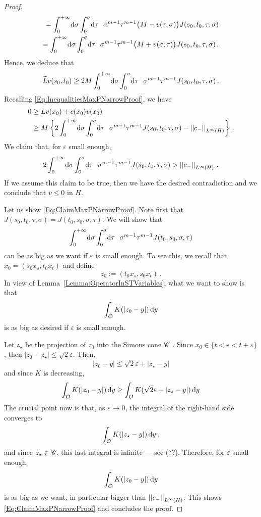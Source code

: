 \begin{proof}
\begin{align*}
	=  \int_0^{+\infty}  \!\! \d \sigma \int_0^{\sigma}  \!\! \d \tau \ \ \sigma^{m-1} \tau^{m-1} \big(M - v(\tau, \sigma)\big) J(s_0,t_0,\tau, \sigma)   \\
	=  \int_0^{+\infty}  \!\! \d \sigma \int_0^{\sigma}  \!\! \d \tau \ \ \sigma^{m-1} \tau^{m-1} \big(M + v(\sigma, \tau)\big) J(s_0,t_0,\tau, \sigma) \,.   \\
	\end{align*}
	Hence, we deduce that
	$$
	\widetilde{L} v (s_0,t_0) \geq 2M \int_0^{+\infty}  \!\! \d \sigma \int_0^{\sigma}  \!\! \d \tau \ \ \sigma^{m-1} \tau^{m-1} J(s_0,t_0,\tau, \sigma)\,.
	$$
	Recalling \eqref{Eq:InequalitiesMaxPNarrowProof}, we have
	\begin{align*}
	0& \geq L v(x_0) + c(x_0)v(x_0)  \\
	& \geq M \left\{ 2 \int_0^{+\infty}  \!\! \,\mathrm{d} \sigma \int_0^{\sigma}  \!\! \,\mathrm{d} \tau \ \ \sigma^{m-1} \tau^{m-1} J(s_0,t_0,\tau, \sigma) - \left | \left |{c_-} \right | \right |_{L^\infty(H)}
	\right\}\,.
	\end{align*}
	We claim that, for $\varepsilon$ small enough,
	\begin{equation}
	\label{Eq:ClaimMaxPNarrowProof}
	2 \int_0^{+\infty}  \!\! \d \sigma \int_0^{\sigma}  \!\! \d \tau \ \ \sigma^{m-1} \tau^{m-1} J(s_0,t_0,\tau, \sigma) > \norm{c_-}_{L^\infty(H)}\,.
	\end{equation}
	If we assume this claim to be true, then we have the desired contradiction and we conclude that $v \leq 0$ in $H$.
	
	Let us show \eqref{Eq:ClaimMaxPNarrowProof}. Note first that $J(s_0, t_0, \tau, \sigma) = J(t_0, s_0, \sigma, \tau)$. We will show that
	$$
	\int_0^{+\infty}  \!\! \,\mathrm{d} \sigma \int_0^{\sigma}  \!\! \,\mathrm{d} \tau \ \ \sigma^{m-1} \tau^{m-1} J(t_0, s_0, \sigma, \tau)
	$$
	can be as big as we want if $\varepsilon$ is small enough. To see this, we recall that $x_0 = (s_0 x_s, t_0 x_t)$ and define
	$$
	z_0 := (t_0 x_s,  s_0 x_t)\,.
	$$
	In view of Lemma~\ref{Lemma:OperatorInSTVariables}, what we want to show is that
	$$
	\int_{\mathcal{O}} K(|z_0 - y|)\,\mathrm{d} y
	$$
	is as big as desired if $\varepsilon$ is small enough.
	
	Let $z_\star$ be the projection of $z_0$ into the Simons cone $\mathscr{C}$ . Since $x_0 \in \{t < s < t + \varepsilon\}$, then $|z_0 - z_\star| \leq \sqrt{2}\varepsilon$. 
	Then,
	$$
	|z_0 - y| \leq \sqrt{2}\varepsilon + |z_\star - y|
	$$
	and since $K$ is decreasing,
	$$
	\int_{\mathcal{O}} K(|z_0 - y|)\,\mathrm{d} y \geq
	\int_{\mathcal{O}} K(\sqrt{2}\varepsilon + |z_\star - y|)\,\mathrm{d} y
	$$
	The crucial point now is that, as $\varepsilon \to 0$, the integral of the right-hand side converges to
	$$
	\int_{\mathcal{O}} K(|z_\star - y|)\,\mathrm{d} y\,,
	$$
	and since $z_\star \in \mathscr{C}$, this last integral is infinite --- see (??). Therefore, for $\varepsilon$ small enough,
	$$
	\int_{\mathcal{O}} K(|z_0 - y|)\,\mathrm{d} y
	$$
	is as big as we want, in particular bigger than $\left | \left |{c_-} \right | \right |_{L^\infty(H)}$. This shows \eqref{Eq:ClaimMaxPNarrowProof} and concludes the proof.
\end{proof}

